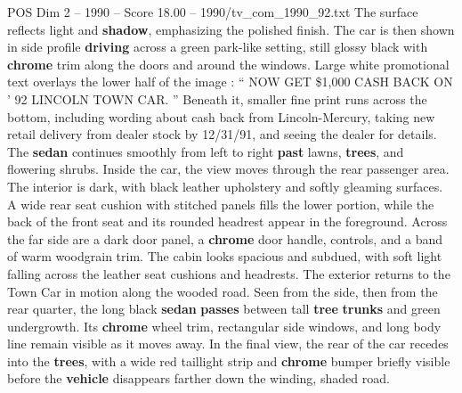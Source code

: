 \begin{textsample}{POS Dim 2 – 1990 – Score 18.00 – 1990/tv\_com\_1990\_92.txt}
The surface reflects light and \textbf{shadow}, emphasizing the polished finish.
The car is then shown in side profile \textbf{driving} across a green park-like setting, still glossy black with \textbf{chrome} trim along the doors and around the windows.
Large white promotional text overlays the lower half of the image : “ NOW GET \$1,000 CASH BACK ON ’ 92 LINCOLN TOWN CAR. ” Beneath it, smaller fine print runs across the bottom, including wording about cash back from Lincoln-Mercury, taking new retail delivery from dealer stock by 12/31/91, and seeing the dealer for details.
The \textbf{sedan} continues smoothly from left to right \textbf{past} lawns, \textbf{trees}, and flowering shrubs.
Inside the car, the view moves through the rear passenger area.
The interior is dark, with black leather upholstery and softly gleaming surfaces.
A wide rear seat cushion with stitched panels fills the lower portion, while the back of the front seat and its rounded headrest appear in the foreground.
Across the far side are a dark door panel, a \textbf{chrome} door handle, controls, and a band of warm woodgrain trim.
The cabin looks spacious and subdued, with soft light falling across the leather seat cushions and headrests.
The exterior returns to the Town Car in motion along the wooded road.
Seen from the side, then from the rear quarter, the long black \textbf{sedan} \textbf{passes} between tall \textbf{tree} \textbf{trunks} and green undergrowth.
Its \textbf{chrome} wheel trim, rectangular side windows, and long body line remain visible as it moves away.
In the final view, the rear of the car recedes into the \textbf{trees}, with a wide red taillight strip and \textbf{chrome} bumper briefly visible before the \textbf{vehicle} disappears farther down the winding, shaded road.

\end{textsample}
